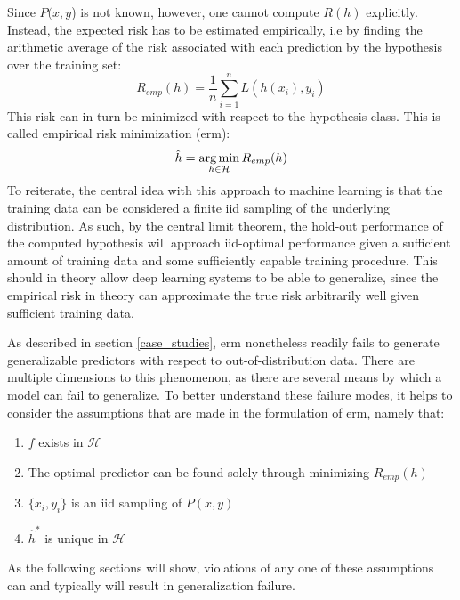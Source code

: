 		Since \(P(x,y\)) is not known, however, one cannot compute \(R(h)\) explicitly. Instead, the expected risk has to be estimated empirically, i.e by finding the arithmetic average of the risk associated with each prediction by the hypothesis over the training set:
		\begin{equation}
		R_{emp}(h) = \frac{1}{n}\sum_{i=1}^{n}L(h(x_i), y_i)
		\end{equation}
		This risk can in turn be minimized with respect to the hypothesis class. This is called empirical risk minimization (\gls{erm}):
		\begin{equation}
		\hat{h} = \operatorname*{arg\,min}_{h \in \mathcal{H}}R_{emp}(h)
		\end{equation}
		To reiterate, the central idea with this approach to machine learning is that the training data can be considered a finite \gls{iid} sampling of the underlying distribution. As such, by the central limit theorem, the hold-out performance of the computed hypothesis will approach \gls{iid}-optimal performance given a sufficient amount of training data and some sufficiently capable training procedure. This should in theory allow deep learning systems to be able to generalize, since the empirical risk in theory can approximate the true risk arbitrarily well given sufficient training data.

		As described in section \ref{case_studies}, \gls{erm} nonetheless readily fails to generate generalizable predictors with respect to out-of-distribution data. There are multiple dimensions to this phenomenon, as there are several means by which a model can fail to generalize. To better understand these failure modes, it helps to consider the assumptions that are made in the formulation of \gls{erm}, namely that:
		\begin{enumerate}
			\item \(f\) exists in \(\mathcal{H}\) \label{underfit}
			\item The optimal predictor can be found solely through minimizing \(R_{emp}(h)\)\label{overfit}
			\item \(\{x_i, y_i\}\) is an \gls{iid} sampling of \(P(x,y)\) \label{structural_misalignment}
			\item \(\hat{h}^*\) is unique in \(\mathcal{H}\)\label{underspecification}
		\end{enumerate}
		As the following sections will show, violations of any one of these assumptions can and typically will result in generalization failure. 


